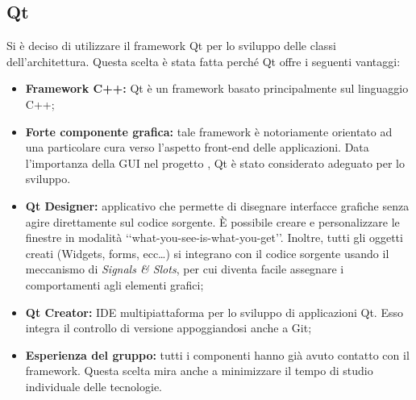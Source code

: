 	\subsection{Qt}
	\label{qt}
	Si è deciso di utilizzare il framework\glossario{} Qt\glossario{} per lo sviluppo delle classi dell'architettura. Questa scelta è stata fatta perché Qt\glossario{} offre i seguenti vantaggi:
	\begin{itemize}
	\item\textbf{Framework C++:} Qt\glossario{} è un framework\g{} basato principalmente sul linguaggio C++\glossario{};
	\item\textbf{Forte componente grafica:} tale framework\glossario{} è notoriamente orientato ad una particolare cura verso l'aspetto front-end delle applicazioni. Data l'importanza della GUI\glossario{} nel progetto \project, Qt\glossario{} è stato considerato adeguato per lo sviluppo.
	\item\textbf{Qt Designer:} applicativo che permette di disegnare interfacce grafiche senza agire direttamente sul codice sorgente. È possibile creare e personalizzare le finestre in modalità \lq\lq{}what-you-see-is-what-you-get\rq\rq{}. Inoltre, tutti gli oggetti creati (Widgets, forms, ecc\dots) si integrano con il codice sorgente usando il meccanismo di \textit{Signals \& Slots}\glossario{}, per cui diventa facile assegnare i comportamenti agli elementi grafici;
	\item\textbf{Qt Creator:} IDE\glossario{} multipiattaforma per lo sviluppo di applicazioni Qt\glossario{}. Esso integra il controllo di versione appoggiandosi anche a Git\glossario{};
	\item\textbf{Esperienza del gruppo:} tutti i componenti hanno già avuto contatto con il framework\glossario{}. Questa scelta mira anche a minimizzare il tempo di studio individuale delle tecnologie.
	\end{itemize}
	
